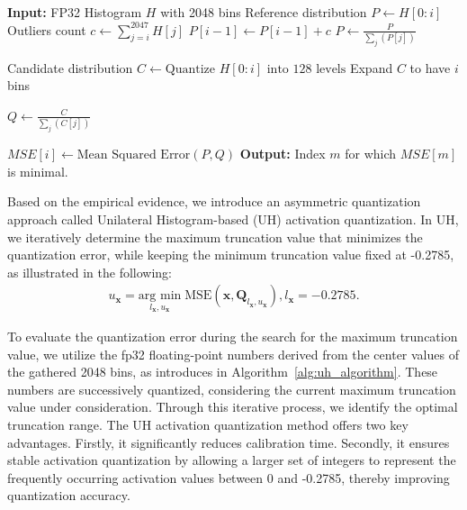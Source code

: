 \documentclass[runningheads]{llncs}
\begin{document}
\begin{algorithm}[ht]
  \caption{Unilateral Histogram-based (UH) Activation Quantization}
  \label{alg:uh_algorithm}
  \begin{algorithmic}[1]
    \STATE \textbf{Input:} FP32 Histogram $H$ with 2048 bins
                \STATE Reference distribution $P \leftarrow H[0:i]$
                \STATE Outliers count $c \leftarrow \sum_{j=i}^{2047} H[j]$
                \STATE $P[i-1] \leftarrow P[i-1] + c$
                \STATE $P \leftarrow \frac{P}{\sum_{j}(P[j])}$
                
                \STATE Candidate distribution $C \leftarrow \text{Quantize } H[0:i] \text{ into 128 levels}$
                \STATE Expand $C$ to have $i$ bins
                
                \STATE $Q \leftarrow \frac{C}{\sum_{j}(C[j])}$
                
                \STATE $MSE[i] \leftarrow \text{Mean Squared Error}(P, Q)$
        \ENDFOR
    \STATE \textbf{Output:} Index $m$ for which $MSE[m]$ is minimal.
  \end{algorithmic}
\end{algorithm}

%
Based on the empirical evidence, we introduce an asymmetric quantization approach called Unilateral Histogram-based (UH) activation quantization. In UH, we iteratively determine the maximum truncation value that minimizes the quantization error, while keeping the minimum truncation value fixed at -0.2785, as illustrated in the following:
%
\begin{align}
u_\mathbf{x}= \underset{l_\mathbf{x}, u_\mathbf{x}}{\text{arg min}} \; \text{MSE}(\mathbf{x}, \mathbf{Q}_{l_\mathbf{x},  
  u_\mathbf{x}}), 
l_\mathbf{x}=-0.2785.
\label{eq:uh}
\end{align}

%
To evaluate the quantization error during the search for the maximum truncation value, we utilize the fp32 floating-point numbers derived from the center values of the gathered 2048 bins, as introduces in Algorithm~\ref{alg:uh_algorithm}. These numbers are successively quantized, considering the current maximum truncation value under consideration. Through this iterative process, we identify the optimal truncation range. The UH activation quantization method offers two key advantages. Firstly, it significantly reduces calibration time. Secondly, it ensures stable activation quantization by allowing a larger set of integers to represent the frequently occurring activation values between 0 and -0.2785, thereby improving quantization accuracy.
\end{document}
